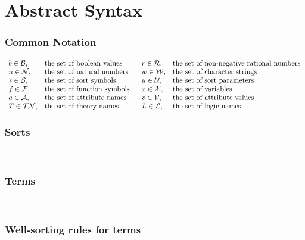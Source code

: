 \chapter{Abstract Syntax}\label{app:abstract-syntax}
\thispagestyle{empty}

{\small

\subsection*{Common Notation}
\smallskip


\[
\begin{array}{llll}
b \in \mathcal{B}, & \text{the set of boolean values}  &
r \in \mathcal{R}, & \text{the set of non-negative rational numbers} \\
n \in \mathcal{N}, & \text{the set of natural numbers}  &
w \in \mathcal{W}, & \text{the set of character strings} \\
s \in \mathcal{S}, & \text{the set of sort symbols} &
u \in \mathcal{U}, & \text{the set of sort parameters} \\
f \in \mathcal{F}, & \text{the set of function symbols\ \ } &
x \in \mathcal{X}, & \text{the set of variables} \\
a \in \mathcal{A}, &  \text{the set of attribute names\ \ } &
v \in \mathcal{V}, &  \text{the set of attribute values} \\
T \in \mathcal{TN}, & \text{the set of theory names} &
L \in \mathcal{L}, & \text{the set of logic names}
\end{array}
\]

\subsection*{Sorts}
\ 

\sortterms


\subsection*{Terms}
\ 

\terms


\newpage
\subsection*{Well-sorting rules for terms}
\ 

\termrules
\medskip

}
